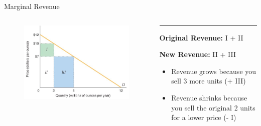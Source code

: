 \documentclass[11pt,t]{beamer}
\begin{document}
\begin{frame}{Marginal Revenue}
  \begin{columns}[T]
    \vspace{0pt}
    \begin{column}{.55\textwidth}
      \begin{figure}
        \includegraphics[width=\textwidth]{figures/fig11_3.jpg}
      \end{figure}
  
      \vspace*{50mm} %
    \end{column}
    
    \hfill
    
    \begin{column}{.45\textwidth}
      {\color{accent}\rule{\linewidth}{2pt}}
  
      \textbf{Original Revenue:} I + II

      \textbf{New Revenue:} II + III

      \bigskip
      \begin{itemize}
        \item Revenue grows because you sell 3 more units (+ III)
        \item Revenue shrinks because you sell the original 2 units for a lower price (- I)
      \end{itemize}
    \end{column}
  \end{columns}
\end{frame}
\end{document}
